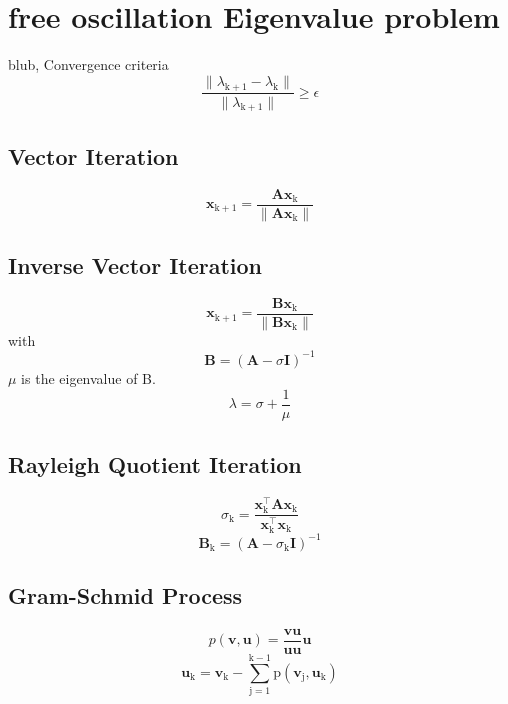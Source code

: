 \documentclass[conference]{journal}%
\begin{document}
	\section{free oscillation Eigenvalue problem}
	blub, Convergence criteria
	\begin{equation}
	\frac{\lVert \lambda_{\mathrm{k+1}}-\lambda_{\mathrm{k}} \rVert}{\lVert \lambda_{\mathrm{k+1}}\rVert}\geq \epsilon
	\end{equation}
	\subsection*{Vector Iteration}
	\begin{equation}
	\textbf{x}_\mathrm{k+1}=\frac{\textbf{Ax}_\mathrm{k}}{\lVert \textbf{Ax}_\mathrm{k} \rVert}
	\end{equation}
	\subsection*{Inverse Vector Iteration}
	\begin{equation}
	\textbf{x}_\mathrm{k+1}=\frac{\textbf{Bx}_\mathrm{k}}{\lVert \textbf{Bx}_\mathrm{k} \rVert}
	\end{equation}
	with
	\begin{equation}
	\textbf{B}=(\textbf{A}-\sigma \textbf{I})^{-1}
	\end{equation}
	$\mu$ is the eigenvalue of B.
	\begin{equation}
	\lambda=\sigma+\frac{1}{\mu}
	\end{equation}
	\subsection*{Rayleigh Quotient Iteration}
	\begin{equation}
	\sigma_{\mathrm{k}}=\frac{\textbf{x}_{\mathrm{k}}^\intercal\textbf{Ax}_{\mathrm{k}}}{\textbf{x}_{\mathrm{k}}^\intercal\textbf{x}_{\mathrm{k}}}
	\end{equation}
	\begin{equation}
	\textbf{B}_{\mathrm{k}}=(\textbf{A}-\sigma_{\mathrm{k}} \textbf{I})^{-1}
	\end{equation}
	\subsection*{Gram-Schmid Process}
	\begin{equation}
	p(\textbf{v},\textbf{u})=\frac{\textbf{v}\textbf{u}}{\textbf{u}\textbf{u}}\textbf{u}
	\end{equation}
	\begin{equation}
	\textbf{u}_{\mathrm{k}} = \textbf{v}_{\mathrm{k}} -\sum_{\mathrm{j=1}}^{\mathrm{k-1}}\mathrm{p}(\textbf{v}_{\mathrm{j}},\textbf{u}_{\mathrm{k}})
	\end{equation}
\end{document}
